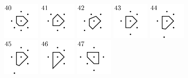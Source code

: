 \documentclass[text.tex]{subfiles}
\begin{document}
\begin{figure}[h!]
\includegraphics[width=0.16\textwidth]{img/results/circle8_concat/circle8_100000_(1_0alpha_1)_040.pdf}
\includegraphics[width=0.16\textwidth]{img/results/circle8_concat/circle8_100000_(1_0alpha_1)_041.pdf}
\includegraphics[width=0.16\textwidth]{img/results/circle8_concat/circle8_100000_(1_0alpha_1)_042.pdf}
\includegraphics[width=0.16\textwidth]{img/results/circle8_concat/circle8_100000_(1_0alpha_1)_043.pdf}
\includegraphics[width=0.16\textwidth]{img/results/circle8_concat/circle8_100000_(1_0alpha_1)_044.pdf}
\includegraphics[width=0.16\textwidth]{img/results/circle8_concat/circle8_100000_(1_0alpha_1)_045.pdf}
\includegraphics[width=0.16\textwidth]{img/results/circle8_concat/circle8_100000_(1_0alpha_1)_046.pdf}
\includegraphics[width=0.16\textwidth]{img/results/circle8_concat/circle8_100000_(1_0alpha_1)_047.pdf}

\end{figure}
\end{document}
